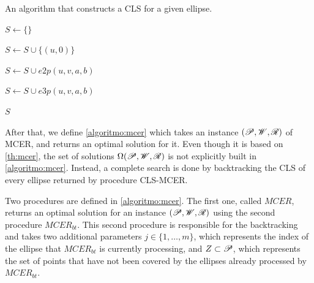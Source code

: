 \begin{algoritmo}
	\caption{An algorithm that constructs a CLS for a given ellipse.}\label{algoritmo:mcer1}
	\begin{algorithmic}[1]
		
		
		\item[]
		
		\State $S \gets \{\}$
		
		\State $S \gets S \cup \{(u, 0)\}$
		\EndFor
		
		\State $S \gets S \cup e2p(u, v, a, b)$
		\EndFor
		
		\State $S \gets S \cup e3p(u, v, a, b)$ 
		\EndFor
		
		\State \Return $S$
		\EndProcedure
	\end{algorithmic}
\end{algoritmo}

After that, we define \autoref{algoritmo:mcer} which takes an instance $(\mathscr{P}, \mathscr{W}, \mathscr{R})$ of MCER, and returns an optimal solution for it.
Even though it is based on \autoref{th:mcer}, the set of solutions $\Omega(\mathscr{P}, \mathscr{W}, \mathscr{R})$ is not explicitly built in \autoref{algoritmo:mcer}. Instead, a complete search is done by backtracking the CLS of every ellipse returned by procedure CLS-MCER.

Two procedures are defined in \autoref{algoritmo:mcer}. The first one, called $MCER$, returns an optimal solution for an instance $(\mathscr{P}, \mathscr{W}, \mathscr{R})$ using the second procedure $MCER_{bt}$. This second procedure is responsible for the backtracking and takes two additional parameters $j\in\{1, \dots, m\}$, which represents the index of the ellipse that $MCER_{bt}$ is currently processing, and $Z\subset \mathscr{P}$, which represents the set of points that have not been covered by the ellipses already processed by $MCER_{bt}$.


